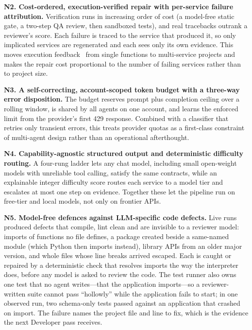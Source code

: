 \documentclass[conference,letterpaper]{IEEEtran}
\begin{document}
\textbf{N2. Cost-ordered, execution-verified repair with per-service failure
attribution.} Verification runs in increasing order of cost (a model-free static
gate, a two-step QA review, then sandboxed tests), and real tracebacks outrank a
reviewer's score. Each failure is traced to the service that produced it, so only
implicated services are regenerated and each sees only its own evidence. This
moves execution feedback~\cite{chen2024selfdebug,shinn2023reflexion} from single
functions to multi-service projects and makes the repair cost proportional to the
number of failing services rather than to project size.

\textbf{N3. A self-correcting, account-scoped token budget with a three-way error
disposition.} The budget reserves prompt plus completion ceiling over a rolling
window, is shared by all agents on one account, and learns the enforced limit from
the provider's first 429 response. Combined with a classifier that retries only
transient errors, this treats provider quotas as a first-class constraint of
multi-agent design rather than an operational afterthought.

\textbf{N4. Capability-agnostic structured output and deterministic difficulty
routing.} A four-rung ladder lets any chat model, including small open-weight
models with unreliable tool calling, satisfy the same contracts, while an
explainable integer difficulty score routes each service to a model tier and
escalates at most one step on evidence. Together these let the pipeline run on
free-tier and local models, not only on frontier APIs.

\textbf{N5. Model-free defences against LLM-specific code defects.} Live runs
produced defects that compile, lint clean and are invisible to a reviewer model:
imports of functions no file defines, a package created beside a same-named module
(which Python then imports instead), library APIs from an older major version, and
whole files whose line breaks arrived escaped. Each is caught or repaired by a
deterministic check that resolves imports the way the interpreter does, before any
model is asked to review the code. The test runner also owns one test that no
agent writes---that the application imports---so a reviewer-written suite cannot
pass ``hollowly'' while the application fails to start; in one observed run, two
schema-only tests passed against an application that crashed on import. The
failure names the project file and line to fix, which is the evidence the next
Developer pass receives.
\end{document}

